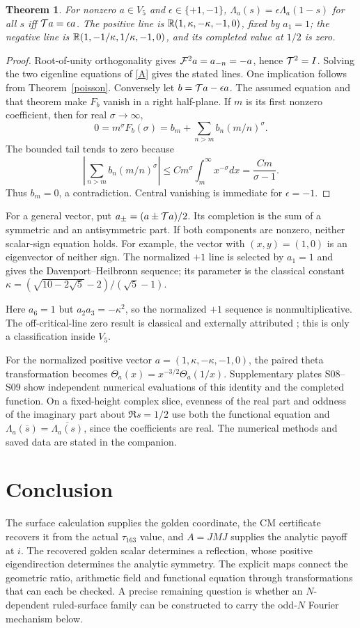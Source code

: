 \documentclass[11pt]{article}
\newtheorem{theorem}{Theorem}[section]\newtheorem{proposition}[theorem]{Proposition}\newtheorem{corollary}[theorem]{Corollary}
\begin{document}
\begin{theorem}\label{classification}
For nonzero $a\in V_5$ and $\epsilon\in\{+1,-1\}$,
$\Lambda_a(s)=\epsilon\Lambda_a(1-s)$ for all $s$ iff $\mathcal T a=\epsilon a$.
The positive line is $\mathbb R(1,\kappa,-\kappa,-1,0)$, fixed by $a_1=1$;
the negative line is $\mathbb R(1,-1/\kappa,1/\kappa,-1,0)$, and its completed
value at $1/2$ is zero.
\end{theorem}
\begin{proof}
Root-of-unity orthogonality gives $\mathcal F^2a=a_{-n}=-a$, hence $\mathcal T^2=I$.
Solving the two eigenline equations of \eqref{A} gives the stated lines.
One implication follows from Theorem~\ref{poisson}.  Conversely let
$b=\mathcal T a-\epsilon a$.  The assumed equation and that theorem make
$F_b$ vanish in a right half-plane.  If $m$ is its first nonzero coefficient,
then for real $\sigma\to\infty$,
\[
0=m^\sigma F_b(\sigma)=b_m+\sum_{n>m}b_n(m/n)^\sigma.
\]
The bounded tail tends to zero because
\[
\left|\sum_{n>m}b_n(m/n)^\sigma\right|
\le C m^\sigma\int_m^\infty x^{-\sigma}dx
=\frac{Cm}{\sigma-1}.
\]
Thus $b_m=0$, a contradiction.
Central vanishing is immediate for $\epsilon=-1$.
\end{proof}
For a general vector, put $a_\pm=(a\pm\mathcal T a)/2$.  Its completion
is the sum of a symmetric and an antisymmetric part.  If both components
are nonzero, neither scalar-sign equation holds.  For example, the vector with $(x,y)=(1,0)$
is an eigenvector of neither sign.  The normalized $+1$ line is selected by
$a_1=1$ and gives the Davenport--Heilbronn sequence; its parameter is the
classical constant $\kappa=(\sqrt{10-2\sqrt5}-2)/(\sqrt5-1)$.

Here $a_6=1$ but $a_2a_3=-\kappa^2$, so the normalized $+1$ sequence is
nonmultiplicative.  The off-critical-line zero result is classical and
externally attributed \cite{Balanzario}; this is only a classification inside
$V_5$.

For the normalized positive vector
$a=(1,\kappa,-\kappa,-1,0)$, the paired theta transformation becomes
$\Theta_a(x)=x^{-3/2}\Theta_a(1/x)$. Supplementary plates S08--S09 show
independent numerical evaluations of this identity and the completed function.
On a fixed-height complex slice, evenness of the real part and oddness of the
imaginary part about $\Re s=1/2$ use both the functional equation and
$\Lambda_a(\overline s)=\overline{\Lambda_a(s)}$, since the coefficients
are real. The numerical methods and saved data are stated in the companion.

\section{Conclusion}
The surface calculation supplies the golden coordinate, the CM certificate
recovers it from the actual $\tau_{163}$ value, and $A=JMJ$ supplies the
analytic payoff at $i$.  The recovered golden scalar determines a reflection,
whose positive eigendirection determines the analytic symmetry.  The explicit
maps connect the geometric ratio, arithmetic field and functional equation
through transformations that can each be checked.  A precise remaining question is whether an
$N$-dependent ruled-surface family can be constructed to carry the odd-$N$
Fourier mechanism below.
\end{document}
